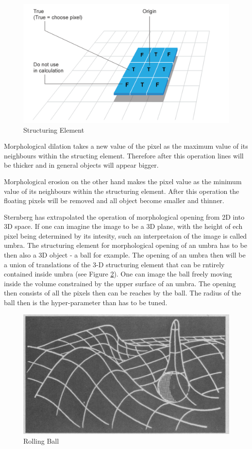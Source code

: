 \begin{figure}[htb]
	\begin{center}
		\includegraphics[width=0.5\linewidth]{bilder/structuring-element.png}
		\caption{Structuring Element}\label{fig:structuring-element}
	\end{center}
\end{figure}

Morphological dilation takes a new value of the pixel as the maximum value of its neighbours within the structing element. Therefore after this operation lines will be thicker and in general objects will appear bigger.

Morphological erosion on the other hand makes the pixel value as the minimum value of its neighbours within the structuring element. After this operation the floating pixels will be removed and all object become smaller and thinner.

Sternberg has extrapolated the operation of morphological opening from 2D into 3D space. If one can imagine the image to be a 3D plane, with the height of ech pixel being determined by its intesity, such an interpretaion of the image is called umbra. The structuring element for morphological opening of an umbra has to be then also a 3D object - a ball for example. The opening of an umbra then will be a union of translations of the 3-D structuring element that can be rntirely contained inside umbra (see Figure \ref{fig:rolling-ball}). One can image the ball freely moving inside the volume constrained by the upper surface of an umbra. The opening then consists of all the pixels then can be reaches by the ball. The radius of the ball then is the hyper-parameter than has to be tuned. 

\begin{figure}[htb]
	\begin{center}
		\includegraphics[width=0.5\linewidth]{bilder/rolling-ball.png}
		\caption{Rolling Ball}\label{fig:rolling-ball}
	\end{center}
\end{figure}
